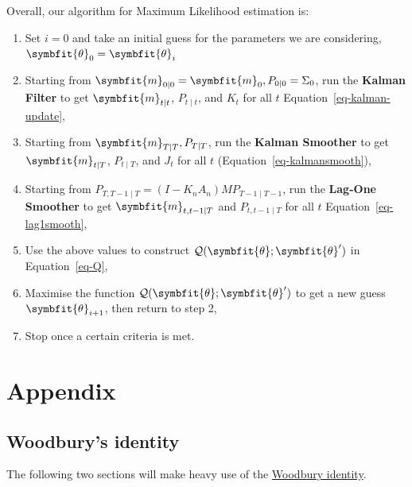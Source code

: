\documentclass[
]{report}
\providecommand{\tightlist}{%
  \setlength{\itemsep}{0pt}\setlength{\parskip}{0pt}}\usepackage{longtable,booktabs,array}
\newcommand{\bv}[1]{\symbfit{#1}}
\theoremstyle{plain}
\theoremstyle{plain}
\theoremstyle{plain}
\theoremstyle{remark}
\begin{document}
Overall, our algorithm for Maximum Likelihood estimation is:

\begin{enumerate}
\def\labelenumi{\arabic{enumi}.}
\tightlist
\item
  Set \(i=0\) and take an initial guess for the parameters we are
  considering, \(\bv\theta_0=\bv\theta_i\)
\item
  Starting from \(\bv m_{0\mid 0}=\bv m_0, P_{0\mid0}=\Sigma_0\), run
  the \textbf{Kalman Filter} to get \(\bv m_{t\mid t}\),
  \(P_{t\mid t}\), and \(K_t\) for all \(t\)
  Equation~\ref{eq-kalman-update},
\item
  Starting from \(\bv m_{T\mid T}, P_{T\mid T}\), run the \textbf{Kalman
  Smoother} to get \(\bv m_{t\mid T}\), \(P_{t\mid T}\), and \(J_t\) for
  all \(t\) (Equation~\ref{eq-kalmansmooth}),
\item
  Starting from \(P_{T,T-1\mid T} = (I - K_nA_n) MP_{T-1\mid T-1}\), run
  the \textbf{Lag-One Smoother} to get \(\bv m_{t,t-1\mid T}\) and
  \(P_{t,t-1\mid T}\) for all \(t\) Equation~\ref{eq-lag1smooth},
\item
  Use the above values to construct
  \(\mathcal Q(\bv\theta;\bv \theta')\) in Equation~\ref{eq-Q},
\item
  Maximise the function \(\mathcal Q(\bv\theta;\bv \theta')\) to get a
  new guess \(\bv \theta_{i+1}\), then return to step 2,
\item
  Stop once a certain criteria is met.
\end{enumerate}

\newpage
\appendix
\renewcommand{\thefigure}{A\arabic{figure}}
\renewcommand{\thetable}{A\arabic{table}}
\setcounter{figure}{0}
\setcounter{table}{0}

\chapter{Appendix}\label{appendix}

\section{Woodbury's identity}\label{woodburys-identity}

The following two sections will make heavy use of the
\href{https://en.wikipedia.org/wiki/Woodbury_matrix_identity}{Woodbury
identity}.
\end{document}
